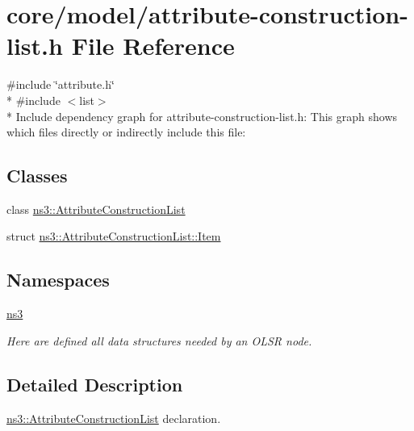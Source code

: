 \hypertarget{attribute-construction-list_8h}{}\section{core/model/attribute-\/construction-\/list.h File Reference}
\label{attribute-construction-list_8h}
{\ttfamily \#include \char`\"{}attribute.\+h\char`\"{}}\\*
{\ttfamily \#include $<$list$>$}\\*
Include dependency graph for attribute-\/construction-\/list.h\+:
This graph shows which files directly or indirectly include this file\+:
\subsection*{Classes}
\begin{DoxyCompactItemize}
\item 
class \hyperlink{classns3_1_1AttributeConstructionList}{ns3\+::\+Attribute\+Construction\+List}
\item 
struct \hyperlink{structns3_1_1AttributeConstructionList_1_1Item}{ns3\+::\+Attribute\+Construction\+List\+::\+Item}
\end{DoxyCompactItemize}
\subsection*{Namespaces}
\begin{DoxyCompactItemize}
\item 
 \hyperlink{namespacens3}{ns3}
\begin{DoxyCompactList}\small\item\em Here are defined all data structures needed by an O\+L\+SR node. \end{DoxyCompactList}\end{DoxyCompactItemize}


\subsection{Detailed Description}
\hyperlink{classns3_1_1AttributeConstructionList}{ns3\+::\+Attribute\+Construction\+List} declaration. 